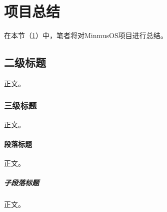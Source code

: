 \section{项目总结}\label{sec:ProjectConclusion}

在本节（\cref{sec:ProjectConclusion}）中，笔者将对MinmusOS项目进行总结。

\subsection{二级标题}

正文。

\subsubsection{三级标题}

正文。

\paragraph{段落标题}

正文。

\subparagraph{子段落标题}

正文。